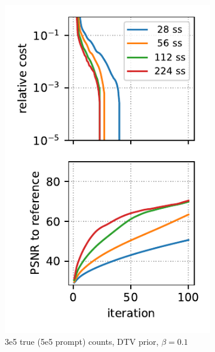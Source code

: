 \begin{figure}
\begin{subfigure}[b]{0.23\textwidth}
    \includegraphics[width=1.0\textwidth]{./figure5b_brain2d_counts_3.0E+05_seed_1_beta_1.0E-01_prior_DTV_niter_ref_20000_fwhm_4.5_4.5_niter_100_ss.pdf}
    \caption{3e5 true (5e5 prompt) counts, DTV prior, $\beta = 0.1$}
  \end{subfigure}
  \hfill
  \begin{subfigure}[b]{0.23\textwidth}
    \centering

\end{subfigure}
\end{figure}
